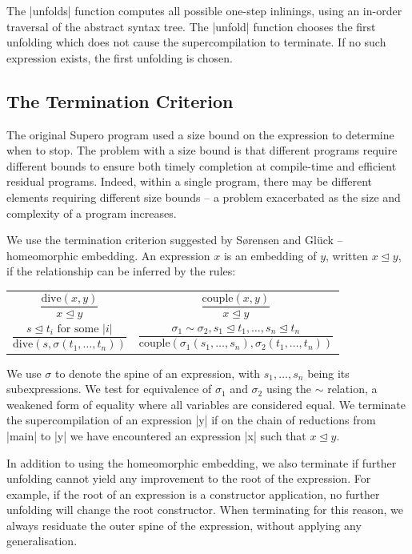 The |unfolds| function computes all possible one-step inlinings, using an in-order traversal of the abstract syntax tree. The |unfold| function chooses the first unfolding which does not cause the supercompilation to terminate. If no such expression exists, the first unfolding is chosen.

\subsection{The Termination Criterion}

The original Supero program used a size bound on the expression to determine when to stop. The problem with a size bound is that different programs require different bounds to ensure both timely completion at compile-time and efficient residual programs. Indeed, within a single program, there may be different elements requiring different size bounds -- a problem exacerbated as the size and complexity of a program increases.

We use the termination criterion suggested by S{\o}rensen and Gl{\"u}ck \cite{sorensen:supercompilation} -- homeomorphic embedding. An expression $x$ is an embedding of $y$, written $x \unlhd y$, if the relationship can be inferred by the rules:

\noindent\begin{tabular}{p{5cm}p{5cm}}
\[\frac{\text{dive}(x,y)}{x \unlhd y}\] \vspace{-8mm}
&
\[\frac{\text{couple}(x,y)}{x \unlhd y}\] \vspace{-8mm}
\\
\[\frac{s \unlhd t_i \text{ for some } |i|}{\text{dive}(s, \sigma(t_1,\ldots,t_n))} \]
&
\[\frac{\sigma_1 \sim \sigma_2,
        s_1 \unlhd t_1, \ldots , s_n \unlhd t_n}
       {\text{couple}(\sigma_1 (s_1,\ldots,s_n), \sigma_2 (t_1,\ldots,t_n))}
\]
\end{tabular}

We use $\sigma$ to denote the spine of an expression, with $s_1,\ldots,s_n$ being its subexpressions. We test for equivalence of $\sigma_1$ and $\sigma_2$ using the $\sim$ relation, a weakened form of equality where all variables are considered equal. We terminate the supercompilation of an expression |y| if on the chain of reductions from |main| to |y| we have encountered an expression |x| such that $x \unlhd y$.

In addition to using the homeomorphic embedding, we also terminate if further unfolding cannot yield any improvement to the root of the expression. For example, if the root of an expression is a constructor application, no further unfolding will change the root constructor. When terminating for this reason, we always residuate the outer spine of the expression, without applying any generalisation.

